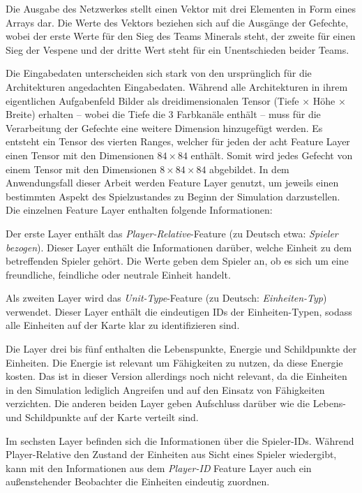 Die Ausgabe des Netzwerkes stellt einen Vektor mit drei Elementen in Form eines Arrays dar. Die Werte des Vektors beziehen sich auf die Ausgänge der Gefechte, wobei der erste Werte für den Sieg des Teams Minerals steht, der zweite für einen Sieg der Vespene und der dritte Wert steht für ein Unentschieden beider Teams. 

Die Eingabedaten unterscheiden sich stark von den ursprünglich für die Architekturen angedachten Eingabedaten. Während alle Architekturen in ihrem eigentlichen Aufgabenfeld Bilder als dreidimensionalen Tensor (Tiefe $\times$ Höhe $\times$ Breite) erhalten -- wobei die Tiefe die 3 Farbkanäle enthält -- muss für die Verarbeitung der Gefechte eine weitere Dimension hinzugefügt werden. Es entsteht ein Tensor des vierten Ranges, welcher für jeden der acht Feature Layer einen Tensor mit den Dimensionen $84 \times 84$ enthält. Somit wird jedes Gefecht von einem Tensor mit den Dimensionen $8 \times 84 \times 84$ abgebildet. In dem Anwendungsfall dieser Arbeit werden Feature Layer genutzt, um jeweils einen bestimmten Aspekt des Spielzustandes zu Beginn der Simulation darzustellen.
Die einzelnen Feature Layer enthalten folgende Informationen: 

Der erste Layer enthält das \textit{Player-Relative}-Feature (zu Deutsch etwa: \textit{Spieler bezogen}). Dieser Layer enthält die Informationen darüber, welche Einheit zu dem betreffenden Spieler gehört. Die Werte geben dem Spieler an, ob es sich um eine freundliche, feindliche oder neutrale Einheit handelt. 

Als zweiten Layer wird das \textit{Unit-Type}-Feature (zu Deutsch: \textit{Einheiten-Typ}) verwendet. Dieser Layer enthält die eindeutigen IDs der Einheiten-Typen, sodass alle Einheiten auf der Karte klar zu identifizieren sind.

Die Layer drei bis fünf enthalten die Lebenspunkte, Energie und Schildpunkte der Einheiten. Die Energie ist relevant um Fähigkeiten zu nutzen, da diese Energie kosten. Das ist in dieser Version allerdings noch nicht relevant, da die Einheiten in den Simulation lediglich Angreifen und auf den Einsatz von Fähigkeiten verzichten. Die anderen beiden Layer geben Aufschluss darüber wie die Lebens- und Schildpunkte auf der Karte verteilt sind.

Im sechsten Layer befinden sich die Informationen über die Spieler-IDs. Während Player-Relative den Zustand der Einheiten aus Sicht eines Spieler wiedergibt, kann mit den Informationen aus dem \textit{Player-ID} Feature Layer auch ein außenstehender Beobachter die Einheiten eindeutig zuordnen.

